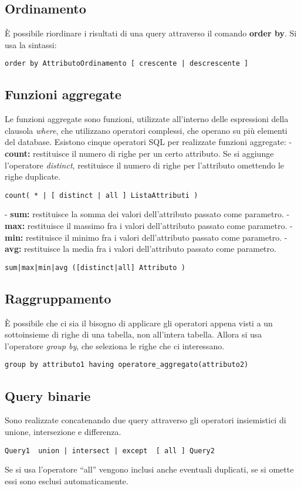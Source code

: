 \documentclass[\main/main.tex]{subfiles}
\begin{document}
\subsection{Ordinamento}
È possibile riordinare i risultati di una query attraverso il comando \textbf{order by}.
Si usa la sintassi:
\begin{verbatim}
order by AttributoOrdinamento [ crescente | descrescente ]
\end{verbatim}

\subsection{Funzioni aggregate}
Le funzioni aggregate sono funzioni, utilizzate all'interno delle espressioni della clausola \textit{where}, che utilizzano operatori complessi, che operano su più elementi del database.
Esistono cinque operatori SQL per realizzate funzioni aggregate:
- \textbf{count:} restituisce il numero di righe per un certo attributo. Se si aggiunge l'operatore \textit{distinct}, restituisce il numero di righe per l'attributo omettendo le righe duplicate.
\begin{verbatim}
count( * | [ distinct | all ] ListaAttributi )
\end{verbatim}
- \textbf{sum:} restituisce la somma dei valori dell'attributo passato come parametro.
- \textbf{max:} restituisce il massimo fra i valori dell'attributo passato come parametro.
- \textbf{min:} restituisce il minimo fra i valori dell'attributo passato come parametro.
- \textbf{avg:} restituisce la media fra i valori dell'attributo passato come parametro.
\begin{verbatim}
sum|max|min|avg ([distinct|all] Attributo )
\end{verbatim}

\subsection{Raggruppamento}
È possibile che ci sia il bisogno di applicare gli operatori appena visti a un sottoinsieme di righe di una tabella, non all'intera tabella.
Allora si usa l'operatore \textit{group by}, che seleziona le righe che ci interessano.
\begin{verbatim}
group by attributo1 having operatore_aggregato(attributo2)
\end{verbatim}

\subsection{Query binarie}
Sono realizzate concatenando due query attraverso gli operatori insiemistici di unione, intersezione e differenza.
\begin{verbatim}
Query1  union | intersect | except  [ all ] Query2
\end{verbatim}
Se si usa l'operatore ``all'' vengono inclusi anche eventuali duplicati, se si omette essi sono esclusi automaticamente.
\end{document}
